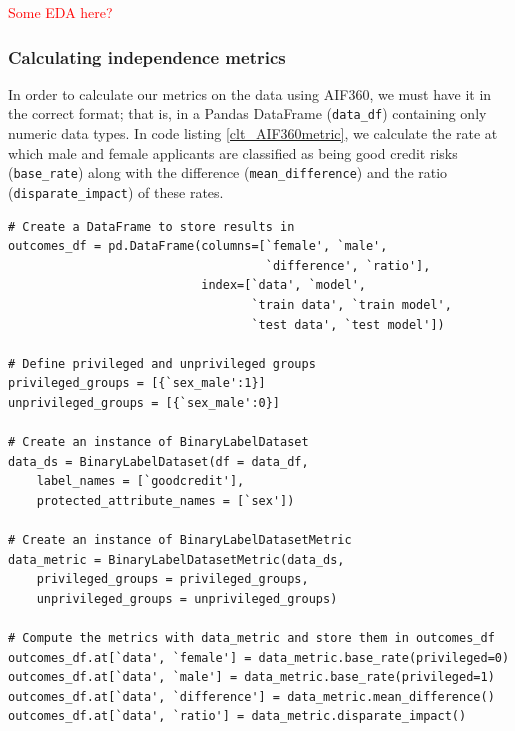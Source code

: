 \textcolor{red}{Some EDA here?}

\subsubsection*{Calculating independence metrics}

In order to calculate our metrics on the data using AIF360, we must have it in the correct format; that is, in a Pandas DataFrame (\texttt{data\_df}) containing only numeric data types. In code listing \ref{clt_AIF360metric}, we calculate the rate at which male and female applicants are classified as being good credit risks (\texttt{base\_rate}) along with the difference (\texttt{mean\_difference}) and the ratio (\texttt{disparate\_impact}) of these rates.
%
\begin{lstlisting}[caption={Calculating independence metrics for the data using AIF360}, label=clt_AIF360metric]
# Create a DataFrame to store results in
outcomes_df = pd.DataFrame(columns=[`female', `male',
                                    `difference', `ratio'],
                           index=[`data', `model',
                                  `train data', `train model',
                                  `test data', `test model'])

# Define privileged and unprivileged groups
privileged_groups = [{`sex_male':1}]
unprivileged_groups = [{`sex_male':0}]

# Create an instance of BinaryLabelDataset
data_ds = BinaryLabelDataset(df = data_df,
    label_names = [`goodcredit'],
    protected_attribute_names = [`sex'])

# Create an instance of BinaryLabelDatasetMetric
data_metric = BinaryLabelDatasetMetric(data_ds,
    privileged_groups = privileged_groups,
    unprivileged_groups = unprivileged_groups)

# Compute the metrics with data_metric and store them in outcomes_df
outcomes_df.at[`data', `female'] = data_metric.base_rate(privileged=0)
outcomes_df.at[`data', `male'] = data_metric.base_rate(privileged=1)
outcomes_df.at[`data', `difference'] = data_metric.mean_difference()
outcomes_df.at[`data', `ratio'] = data_metric.disparate_impact()
\end{lstlisting}

